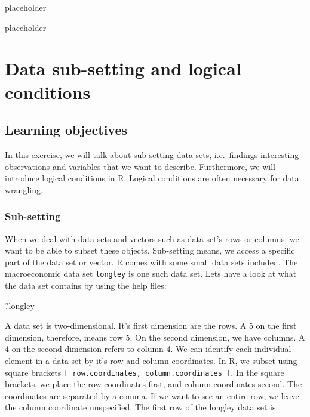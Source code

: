 \documentclass[]{article}
\newenvironment{Shaded}{\begin{snugshade}}{\end{snugshade}}
\newcommand{\NormalTok}[1]{#1}
\begin{document}
placeholder

placeholder

\hypertarget{data-sub-setting-and-logical-conditions}{%
\section{Data sub-setting and logical conditions}\label{data-sub-setting-and-logical-conditions}}

\hypertarget{learning-objectives}{%
\subsection{Learning objectives}\label{learning-objectives}}

In this exercise, we will talk about sub-setting data sets, i.e.~findings interesting observations and variables that we want to describe. Furthermore, we will introduce logical conditions in R. Logical conditions are often necessary for data wrangling.

\hypertarget{sub-setting}{%
\subsubsection{Sub-setting}\label{sub-setting}}

When we deal with data sets and vectors such as data set's rows or columns, we want to be able to subset these objects. Sub-setting means, we access a specific part of the data set or vector. R comes with some small data sets included. The macroeconomic data set \texttt{longley} is one such data set. Lets have a look at what the data set contains by using the help files:

\begin{Shaded}
\begin{Highlighting}[]
\NormalTok{?longley}
\end{Highlighting}
\end{Shaded}

A data set is two-dimensional. It's first dimension are the rows. A 5 on the first dimension, therefore, means row 5. On the second dimension, we have columns. A 4 on the second dimension refers to column 4. We can identify each individual element in a data set by it's row and column coordinates. In R, we subset using square brackets \texttt{{[}\ row.coordinates,\ column.coordinates\ {]}}. In the square brackets, we place the row coordinates first, and column coordinates second. The coordinates are separated by a comma. If we want to see an entire row, we leave the column coordinate unspecified. The first row of the longley data set is:
\end{document}
